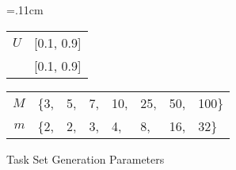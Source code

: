 \begin{wrapfigure}[4]{r}{.5\linewidth}
  \tabcolsep=.11cm
  \begin{tabular}{|r|l|}
    \hline
    ${U}$ & [0.1, 0.9] \\
    \GFactor{} & [0.1, 0.9] \\
    \hline
  \end{tabular} 
  \begin{tabular}{|r|lllllll|}
    \hline
    ${M}$ & \{3, & 5, & 7, & 10, & 25, & 50, & 100\} \\
    ${m}$ & \{2, & 2, & 3, & 4, & 8, & 16, & 32\} \\
    \hline
  \end{tabular}
  \caption{Task Set Generation Parameters }
  \label{fig:gen-params}
\end{wrapfigure}
